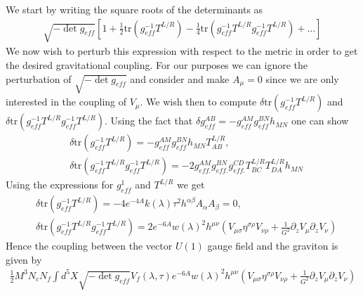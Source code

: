 \documentclass[10 pt]{article}
\begin{document}
We start by writing the square roots of the determinants as
\begin{align}
	\sqrt{-\det g_{eff}} \left[ 1 + \frac{1}{2} \text{tr} \left( g^{-1}_{eff} T^{L/R}\right) - \frac{1}{4} \text{tr} \left( g^{-1}_{eff} T^{L/R} g^{-1}_{eff} T^{L/R} \right) + \dots \right]
\end{align}
We now wish to perturb this expression with respect to the metric in order to get the desired gravitational coupling. For our purposes we can ignore the perturbation of $\sqrt{-\det g_{eff}}$ and consider and make $A_{\mu} = 0$ since we are only interested in the coupling of $V_\mu$. We wish then to compute $\delta \text{tr} \left( g^{-1}_{eff} T^{L/R}\right)$ and $\delta \text{tr} \left( g^{-1}_{eff} T^{L/R} g^{-1}_{eff} T^{L/R} \right)$. Using the fact that $\delta g^{AB}_{eff} = - g_{eff}^{AM} g_{eff}^{BN} h_{MN}$ one can show
\begin{align}
&\delta \text{tr} \left( g^{-1}_{eff} T^{L/R}\right) = -  g_{eff}^{AM} g_{eff}^{BN} h_{MN} T^{L/R}_{AB}, \\
&\delta \text{tr} \left( g^{-1}_{eff} T^{L/R} g^{-1}_{eff} T^{L/R} \right) = - 2 g^{AM}_{eff.} g^{BN}_{eff.} g^{CD}_{eff.} T^{L/R}_{BC} T^{L/R}_{DA} h_{MN}
\end{align}
Using the expressions for $g^{1}_{eff}$ and $T^{L/R}$ we get
\begin{align}
&\delta \text{tr} \left( g^{-1}_{eff} T^{L/R}\right) = - 4 e^{-4A} k\left(\lambda\right) \tau^2 h^{\alpha \beta} A_\alpha A_\beta = 0 , \\
& \delta \text{tr} \left( g^{-1}_{eff} T^{L/R} g^{-1}_{eff} T^{L/R} \right)  = 2 e^{-6A} {w\left( \lambda \right)}^2 h^{\mu \nu} \left( V_{\mu \sigma} \eta^{\sigma \rho} V_{\nu \rho} + \frac{1}{G^2} \partial_z V_\mu \partial_z V_\nu \right)
\end{align}
Hence the coupling between the vector $U(1)$ gauge field and the graviton is given by
\begin{align}
\frac{1}{2} M^3 N_c N_f \int d^5 X \sqrt{-\det g_{eff}} V_{f} \left(\lambda, \tau \right) e^{-6 A} {w\left(\lambda\right)}^2 h^{\mu \nu} \left( V_{\mu \sigma} \eta^{\sigma \rho} V_{\nu \rho} + \frac{1}{G^2} \partial_z V_\mu \partial_z V_\nu \right)
\end{align}
\end{document}
